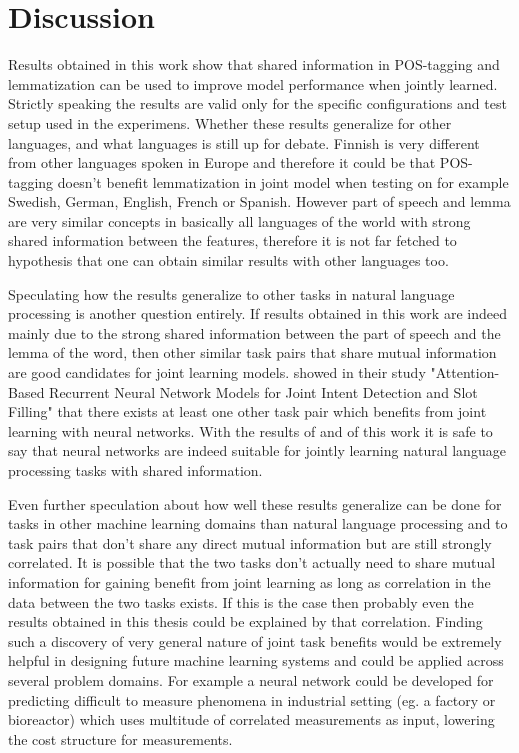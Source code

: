 \documentclass[12pt,a4paper,english
]{tutthesis}
\begin{document}
\chapter{Discussion}
\label{ch:discussion}
Results obtained in this work show that shared information in POS-tagging and lemmatization can be used to improve model performance when jointly learned. Strictly speaking the results are valid only for the specific configurations and test setup used in the experimens. Whether these results generalize for other languages, and what languages is still up for debate. Finnish is very different from other languages spoken in Europe and therefore it could be that POS-tagging doesn't benefit lemmatization in joint model when testing on for example Swedish, German, English, French or Spanish. However part of speech and lemma are very similar concepts in basically all languages of the world with strong shared information between the features, therefore it is not far fetched to hypothesis that one can obtain similar results with other languages too.

Speculating how the results generalize to other tasks in natural language processing is another question entirely. If results obtained in this work are indeed mainly due to the strong shared information between the part of speech and the lemma of the word, then other similar task pairs that share mutual information are good candidates for joint learning models. \cite{Liu2016a} showed in their study "Attention-Based Recurrent Neural Network Models for Joint Intent Detection and Slot Filling" that there exists at least one other task pair which benefits from joint learning with neural networks. With the results of \cite{Liu2016a} and of this work it is safe to say that neural networks are indeed suitable for jointly learning natural language processing tasks with shared information.

Even further speculation about how well these results generalize can be done for tasks in other machine learning domains than natural language processing and to task pairs that don't share any direct mutual information but are still strongly correlated. It is possible that the two tasks don't actually need to share mutual information for gaining benefit from joint learning as long as correlation in the data between the two tasks exists. If this is the case then probably even the results obtained in this thesis could be explained by that correlation. Finding such a discovery of very general nature of joint task benefits would be extremely helpful in designing future machine learning systems and could be applied across several problem domains. For example a neural network could be developed for predicting difficult to measure phenomena in industrial setting (eg. a factory or bioreactor) which uses multitude of correlated measurements as input, lowering the cost structure for measurements.
\end{document}
